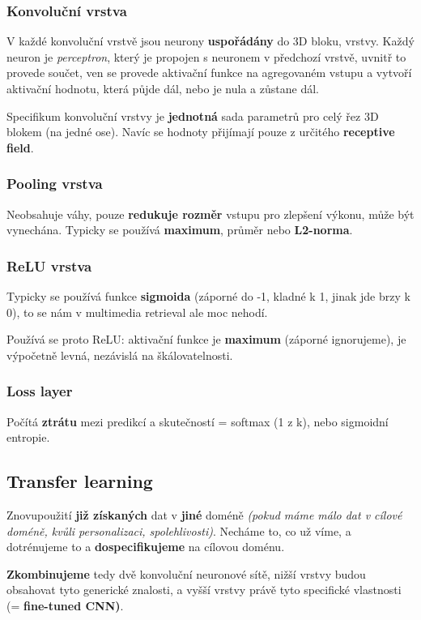 \subsubsection*{Konvoluční vrstva}

V každé konvoluční vrstvě jsou neurony \textbf{uspořádány} do 3D bloku, vrstvy. Každý neuron je \textit{perceptron}, který je propojen s neuronem v předchozí vrstvě, uvnitř to provede součet, ven se provede aktivační funkce na agregovaném vstupu a vytvoří aktivační hodnotu, která půjde dál, nebo je nula a zůstane dál.

Specifikum konvoluční vrstvy je \textbf{jednotná} sada parametrů pro celý řez 3D blokem (na jedné ose). Navíc se hodnoty přijímají pouze z určitého \textbf{receptive field}.

\subsubsection*{Pooling vrstva}

Neobsahuje váhy, pouze \textbf{redukuje rozměr} vstupu pro zlepšení výkonu, může být vynechána. Typicky se používá \textbf{maximum}, průměr nebo \textbf{L2-norma}.

\subsubsection*{ReLU vrstva}

Typicky se používá funkce \textbf{sigmoida} (záporné do -1, kladné k 1, jinak jde brzy k 0), to se nám v multimedia retrieval ale moc nehodí.

Používá se proto ReLU: aktivační funkce je \textbf{maximum} (záporné ignorujeme), je výpočetně levná, nezávislá na škálovatelnosti.

\subsubsection*{Loss layer}

Počítá \textbf{ztrátu} mezi predikcí a skutečností = softmax (1 z k), nebo sigmoidní entropie.

\subsection{Transfer learning}

Znovupoužití \textbf{již získaných} dat v \textbf{jiné} doméně \textit{(pokud máme málo dat v cílové doméně, kvůli personalizaci, spolehlivosti)}. Necháme to, co už víme, a dotrénujeme to a \textbf{dospecifikujeme} na cílovou doménu.

\textbf{Zkombinujeme} tedy dvě konvoluční neuronové sítě, nižší vrstvy budou obsahovat tyto generické znalosti, a vyšší vrstvy právě tyto specifické vlastnosti (= \textbf{fine-tuned CNN)}.
